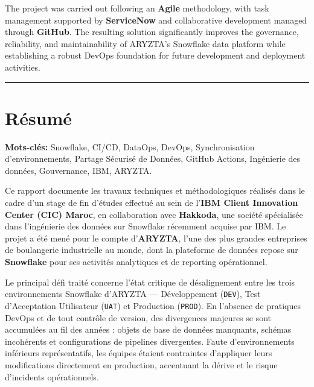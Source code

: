 The project was carried out following an \textbf{Agile} methodology, with task management supported by \textbf{ServiceNow} and collaborative development managed through \textbf{GitHub}. The resulting solution significantly improves the governance, reliability, and maintainability of ARYZTA's Snowflake data platform while establishing a robust DevOps foundation for future development and deployment activities.

\vspace{1cm}
\hrule
\vspace{0.5cm}


\chapter*{Résumé}

\noindent\textbf{Mots-clés:} Snowflake, CI/CD, DataOps, DevOps, Synchronisation d'environnements, Partage Sécurisé de Données, GitHub Actions, Ingénierie des données, Gouvernance, IBM, ARYZTA.

\vspace{0.5cm}

Ce rapport documente les travaux techniques et méthodologiques réalisés dans le cadre d'un stage de fin d'études effectué au sein de l'\textbf{IBM Client Innovation Center (CIC) Maroc}, en collaboration avec \textbf{Hakkoda}, une société spécialisée dans l'ingénierie des données sur Snowflake récemment acquise par IBM. Le projet a été mené pour le compte d'\textbf{ARYZTA}, l'une des plus grandes entreprises de boulangerie industrielle au monde, dont la plateforme de données repose sur \textbf{Snowflake} pour ses activités analytiques et de reporting opérationnel.

Le principal défi traité concerne l'état critique de désalignement entre les trois environnements Snowflake d'ARYZTA --- Développement (\texttt{DEV}), Test d'Acceptation Utilisateur (\texttt{UAT}) et Production (\texttt{PROD}). En l'absence de pratiques DevOps et de tout contrôle de version, des divergences majeures se sont accumulées au fil des années : objets de base de données manquants, schémas incohérents et configurations de pipelines divergentes. Faute d'environnements inférieurs représentatifs, les équipes étaient contraintes d'appliquer leurs modifications directement en production, accentuant la dérive et le risque d'incidents opérationnels.

